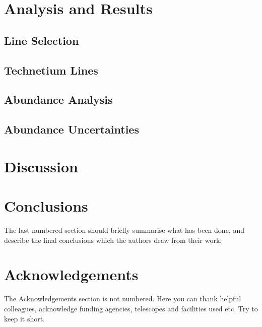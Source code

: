 \documentclass[a4paper,fleqn,usenatbib]{mnras}
\begin{document}
\section{Analysis and Results}

\subsection{Line Selection}
\subsection{Technetium Lines}
\subsection{Abundance Analysis}
\subsection{Abundance Uncertainties}

\section{Discussion}

\section{Conclusions}

The last numbered section should briefly summarise what has been done, and describe
the final conclusions which the authors draw from their work.

\section*{Acknowledgements}

The Acknowledgements section is not numbered. Here you can thank helpful
colleagues, acknowledge funding agencies, telescopes and facilities used etc.
Try to keep it short.
\end{document}
